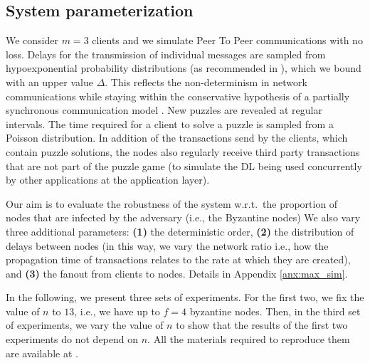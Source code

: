 




\subsection{System parameterization\label{ssec:network_param}}


We consider $m=3$ clients and we simulate Peer To Peer communications with no loss.
Delays for the transmission of individual messages are sampled from hypoexponential probability distributions (as recommended in \cite{models_of_network_delay}), which we bound with an upper value $\Delta$.
This reflects the non-determinism in network communications while staying within the conservative hypothesis of a partially synchronous communication model \cite{consensus_in_the_presence_of_partial_synchrony}.
New puzzles are revealed at regular intervals.
The time required for a client to solve a puzzle is sampled from a Poisson distribution.
In addition of the transactions send by the clients, which contain puzzle solutions, the nodes also regularly receive third party transactions that are not part of the puzzle game (to simulate the DL being used concurrently by other applications at the application layer).


Our aim is to evaluate the robustness of the system w.r.t.~the proportion of nodes that are infected by the adversary (i.e., the Byzantine nodes)
We also vary three additional parameters:
\textbf{(1)} the deterministic order,
\textbf{(2)} the \textcolor{black}{\faClockO} distribution of delays between nodes (in this way, we vary the network ratio \cite{themis_fast_strong_order_fairness_in_byzantine_consensus} i.e., how the propagation time of transactions relates to the rate at which they are created),
and \textbf{(3)} the fanout from clients to nodes.
Details in Appendix \ref{anx:max_sim}.

In the following, we present three sets of experiments.
For the first two, we fix the value of $n$ to $13$, i.e., we have up to $f=4$ byzantine nodes.
Then, in the third set of experiments, we vary the value of $n$ to show that the results of the first two experiments do not depend on $n$.
All the materials required to reproduce them are available at \cite{max_dagrider_order_fairness_exp}.



